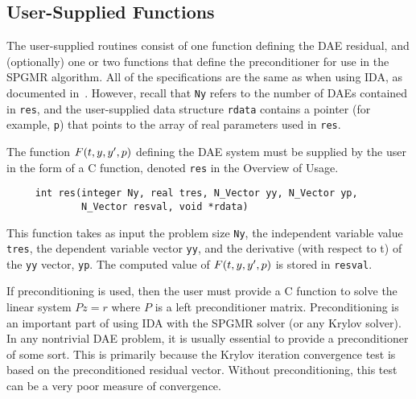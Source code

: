 \subsection{User-Supplied Functions}

The user-supplied routines consist of one function defining the DAE residual, and
(optionally) one or two functions that define the preconditioner for
use in the SPGMR algorithm. 
All of the specifications are the same as when using IDA, as
documented in~\cite{IDA_UG}.
However, recall that {\tt Ny} refers to the number of DAEs contained
in {\tt res}, and the user-supplied data structure {\tt rdata}
contains a pointer (for example, {\tt p}) that points to the array of
real parameters used in {\tt res}.

The function $F(t,y,y^{\prime},p)$ defining the DAE system must be
supplied by the user in the form of a C function, denoted {\tt res} in
the Overview of Usage. 
\begin{verbatim}
     int res(integer Ny, real tres, N_Vector yy, N_Vector yp, 
             N_Vector resval, void *rdata)
\end{verbatim}
This function takes as input the problem size {\tt Ny}, the independent
variable value {\tt tres}, the dependent variable vector {\tt yy}, and
the derivative (with respect to t) of the {\tt yy} vector, {\tt yp}.
The computed value of $F(t, y, y^{\prime}, p)$ is stored in {\tt resval}.

If preconditioning is used, then the user must provide a C function to
solve the linear system $Pz = r$ where $P$ is a left preconditioner
matrix.
Preconditioning is an important part of using IDA with the SPGMR
solver (or any Krylov solver). 
In any nontrivial DAE problem, it is usually essential to provide a
preconditioner of some sort.
This is primarily because the Krylov iteration convergence test is
based on the preconditioned residual vector.
Without preconditioning, this test can be a very poor measure of
convergence.

